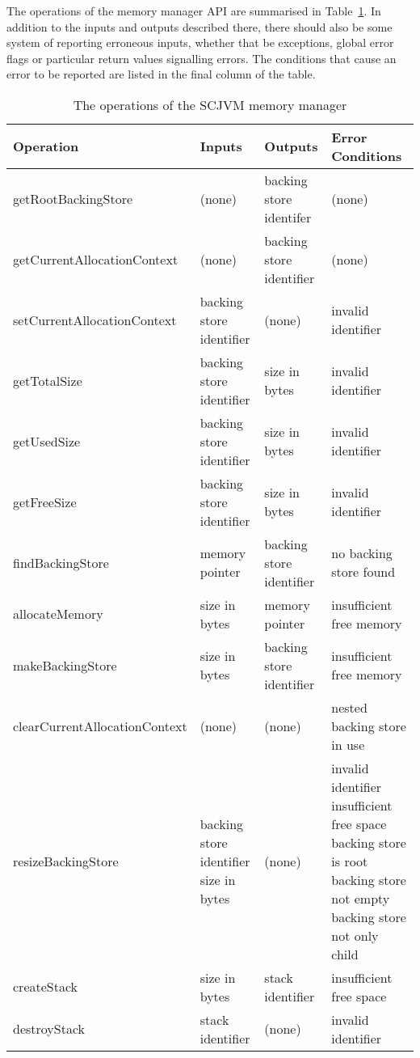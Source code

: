 \documentclass[a4paper,10pt]{article}
\begin{document}
The operations of the memory manager API are summarised in
Table~\ref{memory-manager-table}. In addition to the inputs and outputs
described there, there should also be some system of reporting erroneous inputs,
whether that be exceptions, global error flags or particular return values
signalling errors. The conditions that cause an error to be reported are listed
in the final column of the table.

\begin{table}[ht]
  \centering
  \footnotesize
  \begin{tabular}{|l|p{3cm}|p{3cm}|p{3.6cm}|}
    Operation & Inputs & Outputs & Error Conditions \\
    \hline
    getRootBackingStore &
      (none) &
      backing store identifer &
      (none)
    \\getCurrentAllocationContext &
      (none) &
      backing store identifier &
      (none)
    \\setCurrentAllocationContext &
      backing store identifier &
      (none) &
      invalid identifier
    \\getTotalSize &
      backing store identifier &
      size in bytes &
      invalid identifier
    \\getUsedSize &
      backing store identifier &
      size in bytes &
      invalid identifier
    \\getFreeSize &
      backing store identifier &
      size in bytes &
      invalid identifier
    \\findBackingStore &
      memory pointer &
      backing store identifier &
      no backing store found
    \\allocateMemory &
      size in bytes &
      memory pointer &
      insufficient free memory
    \\makeBackingStore &
      size in bytes & 
      backing store identifier &
      insufficient free memory
    \\clearCurrentAllocationContext &
      (none) &
      (none) &
      nested backing store in use
    \\resizeBackingStore &
      backing store identifier \newline
      size in bytes &
      (none) &
      invalid identifier \newline
      insufficient free space \newline
      backing store is root \newline
      backing store not empty \newline
      backing store not only child
    \\createStack &
      size in bytes &
      stack identifier &
      insufficient free space
    \\destroyStack &
      stack identifier &
      (none) &
      invalid identifier
  \end{tabular}
  \caption{The operations of the SCJVM memory manager}
  \label{memory-manager-table}
\end{table}
\end{document}
